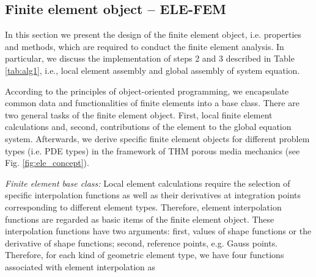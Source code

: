 \subsection{Finite element object -- ELE-FEM}
\label{sec:ele_fem}

In this section we present the design of the finite element object, 
i.e. properties and methods, which are required to conduct the finite 
element analysis. In particular, we discuss the implementation of 
steps 2 and 3 described in  Table 
\ref{tab:alg1}, i.e., local element assembly and global assembly of system 
equation.



According to the principles of object-oriented programming, we
encapsulate common data and functionalities of finite elements into 
a base class. There are two general tasks of the finite element 
object. First, local finite element calculations and, second, 
contributions of the element to the global equation system.
%
Afterwards, we derive specific finite element objects for
different problem types (i.e. PDE types) in the framework of THM
porous media mechanics (see Fig. \ref{fig:ele_concept}).

\emph{Finite element base class:}
%
Local element calculations require the selection of specific
interpolation functions as well as their derivatives at
integration points corresponding to different element types.
Therefore, element interpolation functions are regarded as basic
items of the finite element object.
%
%
These interpolation functions have two arguments: first, values of
shape functions or the derivative of shape functions; second,
reference points, e.g. Gauss points.
Therefore, for each kind of geometric element type, we have four
functions associated with element interpolation as


